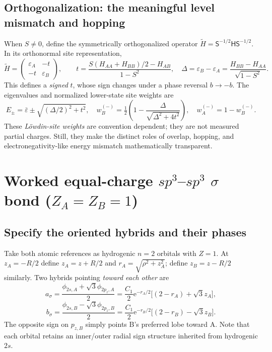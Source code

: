 \documentclass[11pt,letterpaper]{article}
\newcommand{\e}{\mathrm e}
\begin{document}
\subsection{Orthogonalization: the meaningful level mismatch and hopping}
When $S\ne0$, define the symmetrically orthogonalized operator $\widetilde H=\mathsf S^{-1/2}\mathsf H\mathsf S^{-1/2}$. In its orthonormal site representation,
\begin{equation}\label{eq:unequal-lowdin}
\widetilde H=\begin{pmatrix}\varepsilon_A&-t\\-t&\varepsilon_B\end{pmatrix},\qquad
\boxed{t=\frac{S(H_{AA}+H_{BB})/2-H_{AB}}{1-S^2},\quad
\Delta=\varepsilon_B-\varepsilon_A=\frac{H_{BB}-H_{AA}}{\sqrt{1-S^2}}.}
\end{equation}
This defines a \emph{signed} $t$, whose sign changes under a phase reversal $b\to-b$. The eigenvalues and normalized lower-state site weights are
\begin{equation}\label{eq:polar-weights}
E_\pm=\bar\varepsilon\pm\sqrt{(\Delta/2)^2+t^2},\quad
w_B^{(-)}=\tfrac12\left(1-\frac{\Delta}{\sqrt{\Delta^2+4t^2}}\right),\quad
w_A^{(-)}=1-w_B^{(-)}.
\end{equation}
These \emph{L\"owdin-site weights} are convention dependent; they are not measured partial charges. Still, they make the distinct roles of overlap, hopping, and electronegativity-like energy mismatch mathematically transparent.

\section{Worked equal-charge $sp^3$--$sp^3$ $\sigma$ bond ($Z_A=Z_B=1$)}
\subsection{Specify the oriented hybrids and their phases}
Take both atomic references as hydrogenic $n=2$ orbitals with $Z=1$. At $z_A=-R/2$ define $z_A=z+R/2$ and $r_A=\sqrt{\rho^2+z_A^2}$; define $z_B=z-R/2$ similarly. Two hybrids pointing \emph{toward each other} are
\begin{equation}\label{eq:sigma-hybrids}
\boxed{a_\sigma=\frac{\phi_{2s,A}+\sqrt3\phi_{2p_z,A}}2
=\frac{C_1}{2}\e^{-r_A/2}\big[(2-r_A)+\sqrt3z_A\big],}
\end{equation}
\begin{equation}
\boxed{b_\sigma=\frac{\phi_{2s,B}-\sqrt3\phi_{2p_z,B}}2
=\frac{C_1}{2}\e^{-r_B/2}\big[(2-r_B)-\sqrt3z_B\big].}
\end{equation}
The opposite sign on $p_{z,B}$ simply points B's preferred lobe toward A. Note that each orbital retains an inner/outer radial sign structure inherited from hydrogenic $2s$.
\end{document}
